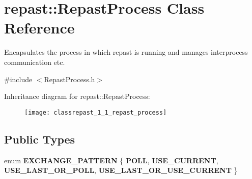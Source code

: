 \hypertarget{classrepast_1_1_repast_process}{\section{repast\-:\-:Repast\-Process Class Reference}
\label{classrepast_1_1_repast_process}
}


Encapsulates the process in which repast is running and manages interprocess communication etc.  




{\ttfamily \#include $<$Repast\-Process.\-h$>$}

Inheritance diagram for repast\-:\-:Repast\-Process\-:\begin{figure}[H]
\begin{center}
\leavevmode
\texttt{[image: classrepast\_1\_1\_repast\_process]}
\end{center}
\end{figure}
\subsection*{Public Types}
\begin{DoxyCompactItemize}
\item 
enum {\bfseries E\-X\-C\-H\-A\-N\-G\-E\-\_\-\-P\-A\-T\-T\-E\-R\-N} \{ {\bfseries P\-O\-L\-L}, 
{\bfseries U\-S\-E\-\_\-\-C\-U\-R\-R\-E\-N\-T}, 
{\bfseries U\-S\-E\-\_\-\-L\-A\-S\-T\-\_\-\-O\-R\-\_\-\-P\-O\-L\-L}, 
{\bfseries U\-S\-E\-\_\-\-L\-A\-S\-T\-\_\-\-O\-R\-\_\-\-U\-S\-E\-\_\-\-C\-U\-R\-R\-E\-N\-T}
 \}
\end{DoxyCompactItemize}
